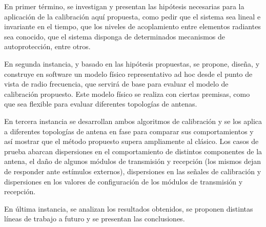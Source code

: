 \documentclass[11pt, oneside]{Thesis} %
\begin{document}
{En primer término, se investigan y presentan las hipótesis necesarias para la aplicación de la calibración aquí propuesta, como
pedir que el sistema sea lineal e invariante en el tiempo, que los niveles de acoplamiento entre elementos radiantes sea
conocido, que el sistema disponga de determinados mecanismos de autoprotección, entre otros.

En segunda instancia, y basado en las hipótesis propuestas, se propone, diseña, y construye en software un modelo físico 
representativo ad hoc desde el punto de vista de radio frecuencia, que servirá de base para evaluar el modelo de calibración 
propuesto. Este modelo físico se realiza con ciertas premisas, como que sea flexible para evaluar diferentes topologías de
antenas.

En tercera instancia se desarrollan ambos algoritmos de calibración y se los aplica a diferentes topologías de antena en fase 
para comparar sus comportamientos y así mostrar que el método propuesto supera ampliamente al clásico. Los casos de prueba
abarcan dispersiones en el comportamiento de distintos componentes de la antena, el daño de algunos módulos de transmisión y
recepción (los mismos dejan de responder ante estímulos externos), dispersiones en las señales de calibración y dispersiones en
los valores de configuración de los módulos de transmisión y recepción. 

En última instancia, se analizan los resultados obtenidos, se proponen distintas líneas de trabajo a futuro y se presentan las
conclusiones.
}

\clearpage %



\clearpage %
\end{document}
